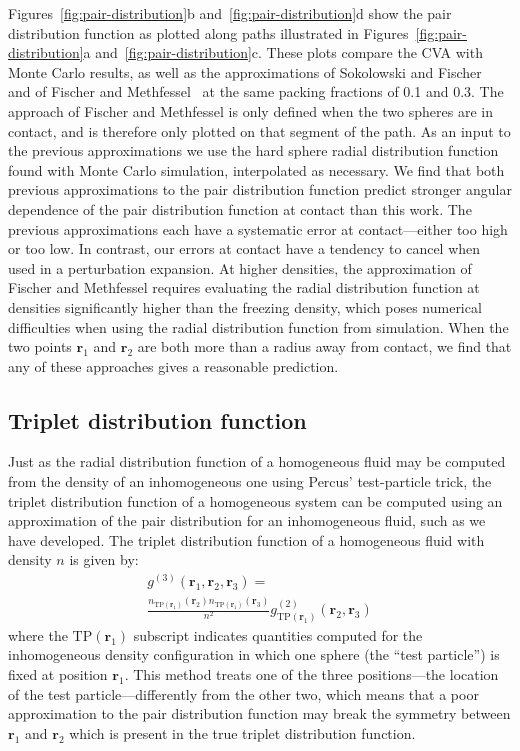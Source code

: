 \documentclass[letterpaper,twocolumn,amsmath,amssymb,pre,aps,10pt]{revtex4-1}
\newcommand{\rr}{\textbf{r}}
\begin{document}
Figures~\ref{fig:pair-distribution}b and~\ref{fig:pair-distribution}d
show the pair distribution function as plotted along paths illustrated
in Figures~\ref{fig:pair-distribution}a
and~\ref{fig:pair-distribution}c.  These plots compare the CVA with
Monte Carlo results, as well as the approximations of Sokolowski and
Fischer~\cite{sokolowski1992role} and of Fischer and
Methfessel~\cite{fischer1980born} at the same packing fractions of 0.1
and 0.3.  The approach of Fischer and Methfessel is only defined when
the two spheres are in contact, and is therefore only plotted on that
segment of the path.  As an input to the previous approximations we
use the hard sphere radial distribution function found with Monte
Carlo simulation, interpolated as necessary. We find that both
previous approximations to the pair distribution function predict
stronger angular dependence of the pair distribution function at
contact than this work.  The previous approximations each have a
systematic error at contact---either too high or too low.  In
contrast, our errors at contact have a tendency to cancel when used in
a perturbation expansion.  At higher densities, the approximation of
Fischer and Methfessel requires evaluating the radial distribution
function at densities significantly higher than the freezing density,
which poses numerical difficulties when using the radial distribution
function from simulation.  When the two points $\rr_1$ and $\rr_2$ are
both more than a radius away from contact, we find that any of these
approaches gives a reasonable prediction.

\subsection{Triplet distribution function}

Just as the radial distribution function of a homogeneous fluid may be
computed from the density of an inhomogeneous one using Percus'
test-particle trick, the triplet distribution function of a
homogeneous system can be computed using an approximation of the pair
distribution for an inhomogeneous fluid, such as we have
developed. The triplet distribution function of a homogeneous fluid
with density $n$ is given by:
\begin{multline}
    g^{(3)}(\rr_1,\rr_2,\rr_3) =\\
    \frac{n_{\textrm{TP}(\rr_1)}(\rr_2)
      n_{\textrm{TP}(\rr_1)}(\rr_3)}{n^2}
    g^{(2)}_{\textrm{TP}(\rr_1)}(\rr_2,\rr_3)
\end{multline}
where the $\textrm{TP}(\rr_1)$ subscript indicates quantities computed for
the inhomogeneous density configuration in which one sphere (the
``test particle'') is fixed
at position $\rr_1$.  This method treats one of the three
positions---the location of the test particle---differently from the
other two, which means that a poor approximation to the pair distribution
function may break the symmetry between $\rr_1$ and $\rr_2$ which is
present in the true triplet distribution function.
\end{document}
